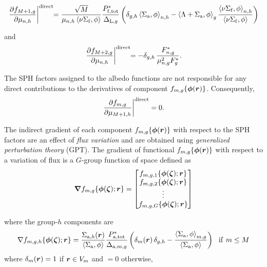\begin{equation}
\left.{\partial f_{M+1,g}\over \partial \mu_{n,h}}\right|^{\rm direct} \negthinspace\negthinspace =   { \sqrt{M} \over  \mu_{n,h}  \left< \nu\Sigma_{\rm f},\phi\right>}  {P^*_{{\rm f},{\rm tot}}\over  \Delta_{{\rm L},g} } 
\left( \delta_{g,h}\left<\Sigma_{\rm a} ,\phi\right>_{n,h}-\left<\Lambda+\Sigma_{\rm a}  ,\phi\right>_g {\left< \nu\Sigma_{\rm f} ,\phi \right>_{n,h} \over  \left< \nu\Sigma_{\rm f},\phi\right>}\right)
\label{eq:eq2.10}
\end{equation}

\noindent and
\begin{equation}
\left.{\partial f_{M+2,g}\over \partial \mu_{n,h}}\right|^{\rm direct} \negthinspace\negthinspace = -\delta_{g,h}\, {F^*_{n,g} \over \mu_{n,g}^2 F^*_g} .
\label{eq:eq2.11}
\end{equation}

\vskip 0.08cm

The SPH factors assigned to the albedo functions are not responsible for any direct contributions to the derivatives of component $f_{m,g}\{\bff(\phi)(\bff(r))\}$. Consequently,
\begin{equation}
\left.{\partial f_{m,g}\over \partial \mu_{M+1,h}}\right|^{\rm direct}=0 .
\label{eq:eq2.11a}
\end{equation}

\vskip 0.08cm

The indirect gradient of each component $f_{m,g}\{\bff(\phi)(\bff(r))\}$ with respect to the SPH factors are an effect of {\sl flux variation} and are obtained using {\sl generalized perturbation theory} (GPT). The gradient of functional $f_{m,g}\{\bff(\phi)(\bff(r))\}$ with respect to a variation of flux is a $G$-group function of space defined as
\begin{equation}
\bff(\nabla)f_{m,g}\{\bff(\phi)(\bff(\zeta));\bff(r)\}=\left[\begin{matrix}f_{m,g,1}\{\bff(\phi)(\bff(\zeta));\bff(r)\} \cr f_{m,g,2}\{\bff(\phi)(\bff(\zeta));\bff(r)\}  \cr \vdots\cr f_{m,g,G}\{\bff(\phi)(\bff(\zeta));\bff(r)\} \end{matrix}\right]
\label{eq:eq2.12}
\end{equation}

\noindent where the group-$h$ components are
\begin{equation}
\nabla f_{m,g,h}\{\bff(\phi)(\bff(\zeta));\bff(r)\} = {\Sigma_{{\rm a},h}(\bff(r))\over \left< \Sigma_{\rm a} , \phi \right>} {P^*_{{\rm a},{\rm tot}}\over \Delta_{{\rm a},m,g} } \left( \delta_m(\bff(r)) \, \delta_{g,h}-
{\left< \Sigma_{\rm a} , \phi \right>_{m,g}\over \left< \Sigma_{\rm a} , \phi \right>} \right) \ \ {\rm if} \ m\le M
\label{eq:eq2.13}
\end{equation}
\noindent where $\delta_m(\bff(r))=1$ if $\bff(r) \in V_m$ and $=0$ otherwise,

